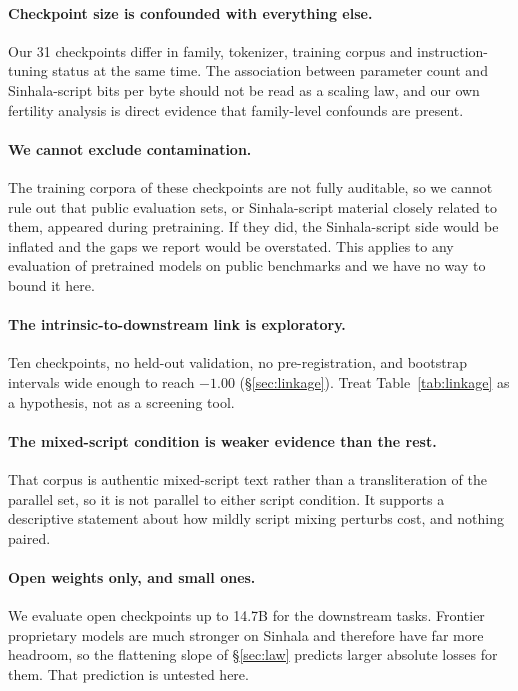 \documentclass[11pt]{article}
\begin{document}
\paragraph{Checkpoint size is confounded with everything else.} Our 31
checkpoints differ in family, tokenizer, training corpus and instruction-tuning
status at the same time. The association between parameter count and
Sinhala-script bits per byte should not be read as a scaling law, and our own
fertility analysis is direct evidence that family-level confounds are present.

\paragraph{We cannot exclude contamination.} The training corpora of these
checkpoints are not fully auditable, so we cannot rule out that public
evaluation sets, or Sinhala-script material closely related to them, appeared
during pretraining. If they did, the Sinhala-script side would be inflated and
the gaps we report would be overstated. This applies to any evaluation of
pretrained models on public benchmarks and we have no way to bound it here.

\paragraph{The intrinsic-to-downstream link is exploratory.} Ten checkpoints, no
held-out validation, no pre-registration, and bootstrap intervals wide enough to
reach $-1.00$ (\S\ref{sec:linkage}). Treat Table~\ref{tab:linkage} as a
hypothesis, not as a screening tool.

\paragraph{The mixed-script condition is weaker evidence than the rest.} That
corpus is authentic mixed-script text rather than a transliteration of the
parallel set, so it is not parallel to either script condition. It supports a
descriptive statement about how mildly script mixing perturbs cost, and nothing
paired.

\paragraph{Open weights only, and small ones.} We evaluate open checkpoints up to
14.7B for the downstream tasks. Frontier proprietary models are much stronger on
Sinhala \citep{pramodya-etal-2025-sinhalammlu} and therefore have far more
headroom, so the flattening slope of \S\ref{sec:law} predicts larger absolute
losses for them. That prediction is untested here.
\end{document}
